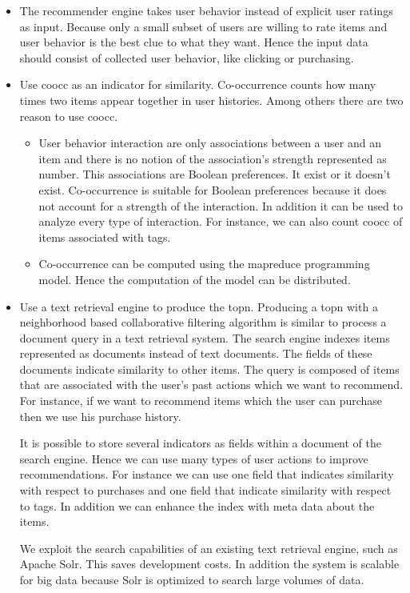 \begin{itemize}
\item The recommender engine takes user behavior instead of explicit user ratings as input. Because only a small subset of users are willing to rate items and user behavior is the best clue to what they want. Hence the input data should consist of collected user behavior, like clicking or purchasing.

\item Use \gls{coocc} as an \gls{indicator} for similarity. Co-occurrence counts how many times two items appear together in user histories. Among others there are two reason to use \gls{coocc}. 

\begin{itemize}
  \item User behavior interaction are only associations between a user and an item and there is no notion of the association's strength represented as number. This associations are Boolean preferences. It exist or it doesn't exist. Co-occurrence is suitable for Boolean preferences because it does not account for a strength of the interaction. In addition it can be used to analyze every type of interaction. For instance, we can also count \gls{coocc} of items associated with tags.
  \item Co-occurrence can be computed using the \gls{mapreduce} programming model. Hence the computation of the model can be distributed.
\end{itemize}

\item Use a text retrieval engine to produce the \gls{topn}. Producing a \gls{topn} with a neighborhood based collaborative filtering algorithm is similar to process a document query in a text retrieval system. The search engine indexes items represented as documents instead of text documents. The fields of these documents indicate similarity to other items. The query is composed of items that are associated with the user's past actions which we want to recommend. For instance, if we want to recommend items which the user can purchase then we use his purchase history. 

It is possible to store several indicators as fields within a document of the search engine. Hence we can use many types of user actions to improve recommendations. For instance we can use one field that indicates similarity with respect to purchases and one field that indicate similarity with respect to \glspl{tag}. In addition we can enhance the index with meta data about the items.

We exploit the search capabilities of an existing text retrieval engine, such as Apache Solr. This saves development costs. In addition the system is \gls{scalable} for big data because Solr is optimized to search large volumes of data.

\end{itemize}

